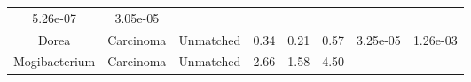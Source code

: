 \documentclass[12pt,]{article}
\begin{document}
\begin{longtable}[]{@{}cccccccc@{}}
\begin{minipage}[t]{0.06\columnwidth}
5.26e-07\strut
\end{minipage} & \begin{minipage}[t]{0.06\columnwidth}\centering\strut
3.05e-05\strut
\end{minipage}\tabularnewline
\begin{minipage}[t]{0.19\columnwidth}\centering\strut
Dorea\strut
\end{minipage} & \begin{minipage}[t]{0.07\columnwidth}\centering\strut
Carcinoma\strut
\end{minipage} & \begin{minipage}[t]{0.09\columnwidth}\centering\strut
Unmatched\strut
\end{minipage} & \begin{minipage}[t]{0.03\columnwidth}\centering\strut
0.34\strut
\end{minipage} & \begin{minipage}[t]{0.14\columnwidth}\centering\strut
0.21\strut
\end{minipage} & \begin{minipage}[t]{0.14\columnwidth}\centering\strut
0.57\strut
\end{minipage} & \begin{minipage}[t]{0.06\columnwidth}\centering\strut
3.25e-05\strut
\end{minipage} & \begin{minipage}[t]{0.06\columnwidth}\centering\strut
1.26e-03\strut
\end{minipage}\tabularnewline
\begin{minipage}[t]{0.19\columnwidth}\centering\strut
Mogibacterium\strut
\end{minipage} & \begin{minipage}[t]{0.07\columnwidth}\centering\strut
Carcinoma\strut
\end{minipage} & \begin{minipage}[t]{0.09\columnwidth}\centering\strut
Unmatched\strut
\end{minipage} & \begin{minipage}[t]{0.03\columnwidth}\centering\strut
2.66\strut
\end{minipage} & \begin{minipage}[t]{0.14\columnwidth}\centering\strut
1.58\strut
\end{minipage} & \begin{minipage}[t]{0.14\columnwidth}\centering\strut
4.50\strut
\end{minipage} & \begin{minipage}[t]{0.06\columnwidth}\centering\strut

\end{minipage}
\end{longtable}
\end{document}
